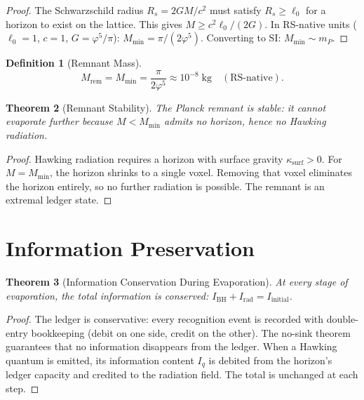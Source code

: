 \documentclass[12pt,a4paper]{article}
\newtheorem{theorem}{Theorem}[section]
\theoremstyle{definition}
\newtheorem{definition}[theorem]{Definition}
\theoremstyle{remark}
\begin{document}
\begin{proof}
The Schwarzschild radius $R_s = 2GM/c^2$ must satisfy
$R_s \geq \ell_0$ for a horizon to exist on the lattice.  This gives
$M \geq c^2 \ell_0/(2G)$.  In RS-native units ($\ell_0 = 1$,
$c = 1$, $G = \varphi^5/\pi$):
$M_{\mathrm{min}} = \pi/(2\varphi^5)$.  Converting to SI:
$M_{\mathrm{min}} \sim m_P$.
\end{proof}

\begin{definition}[Remnant Mass]
\begin{equation}
  M_{\mathrm{rem}} = M_{\mathrm{min}}
  = \frac{\pi}{2\varphi^5} \approx 10^{-8}\;\mathrm{kg}
  \quad (\text{RS-native}).
\end{equation}
\end{definition}

\begin{theorem}[Remnant Stability]
\label{thm:stable}
The Planck remnant is stable: it cannot evaporate further because
$M < M_{\mathrm{min}}$ admits no horizon, hence no Hawking radiation.
\end{theorem}

\begin{proof}
Hawking radiation requires a horizon with surface gravity
$\kappa_{\mathrm{surf}} > 0$.  For $M = M_{\mathrm{min}}$, the
horizon shrinks to a single voxel.  Removing that voxel eliminates
the horizon entirely, so no further radiation is possible.  The
remnant is an extremal ledger state.
\end{proof}

\section{Information Preservation}
\label{sec:information}

\begin{theorem}[Information Conservation During Evaporation]
\label{thm:info}
At every stage of evaporation, the total information is conserved:
$I_{\mathrm{BH}} + I_{\mathrm{rad}} = I_{\mathrm{initial}}$.
\end{theorem}

\begin{proof}
The ledger is conservative: every recognition event is recorded with
double-entry bookkeeping (debit on one side, credit on the other).
The no-sink theorem guarantees that no information disappears from
the ledger.  When a Hawking quantum is emitted, its information
content $I_q$ is debited from the horizon's ledger capacity and
credited to the radiation field.  The total is unchanged at each step.
\end{proof}
\end{document}
